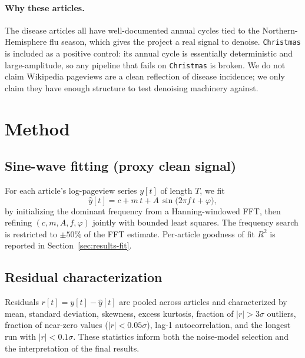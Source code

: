 \documentclass[11pt]{article}
\begin{document}
\paragraph{Why these articles.} The disease articles all have well-documented annual cycles tied to the Northern-Hemisphere flu season, which gives the project a real signal to denoise. \texttt{Christmas} is included as a positive control: its annual cycle is essentially deterministic and large-amplitude, so any pipeline that fails on \texttt{Christmas} is broken. We do not claim Wikipedia pageviews are a clean reflection of disease incidence; we only claim they have enough structure to test denoising machinery against.

\section{Method}

\subsection{Sine-wave fitting (proxy clean signal)}\label{sec:sinefit}
For each article's log-pageview series $y[t]$ of length $T$, we fit
\begin{equation}
\hat{y}[t] = c + m\,t + A\,\sin\!\bigl(2\pi f\, t + \varphi\bigr),
\end{equation}
by initializing the dominant frequency from a Hanning-windowed FFT, then refining $(c, m, A, f, \varphi)$ jointly with bounded least squares. The frequency search is restricted to $\pm 50\%$ of the FFT estimate. Per-article goodness of fit $R^2$ is reported in Section~\ref{sec:results-fit}.

\subsection{Residual characterization}
Residuals $r[t] = y[t] - \hat{y}[t]$ are pooled across articles and characterized by mean, standard deviation, skewness, excess kurtosis, fraction of $|r| > 3\sigma$ outliers, fraction of near-zero values ($|r| < 0.05\sigma$), lag-1 autocorrelation, and the longest run with $|r| < 0.1\sigma$. These statistics inform both the noise-model selection and the interpretation of the final results.
\end{document}
